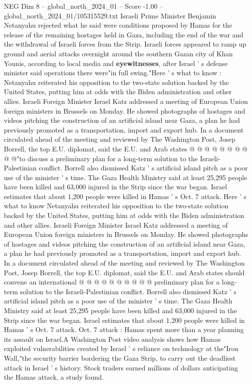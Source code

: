 \begin{textsample}{NEG Dim 8 – global\_north\_2024\_01 – Score -1.00 – global\_north\_2024\_01/105315529.txt}  \label{ex:f8_neg_275}
Israeli Prime Minister Benjamin Netanyahu rejected what he said were conditions proposed by Hamas for the release of the remaining hostages held in Gaza, including the end of the war and the withdrawal of Israeli forces from the Strip.
Israeli forces appeared to ramp up ground and aerial attacks overnight around the southern Gazan city of Khan Younis, according to local media and \textbf{eyewitnesses}, after Israel ' s defense minister said operations there were"in full swing."Here ' s what to know : Netanyahu reiterated his opposition to the two-state solution backed by the United States, putting him at odds with the Biden administration and other allies.
Israeli Foreign Minister Israel Katz addressed a meeting of European Union foreign ministers in Brussels on Monday.
He showed photographs of hostages and videos pitching the construction of an artificial island near Gaza, a plan he had previously promoted as a transportation, import and export hub.
In a document circulated ahead of the meeting and reviewed by The Washington Post, Josep Borrell, the top E.U. diplomat, said the E.U. and Arab states @ @ @ @ @ @ @ @ @ @"to discuss a preliminary plan for a long-term solution to the Israeli-Palestinian conflict.
Borrell also dismissed Katz ' s artificial island pitch as a poor use of the minister ' s time.
The Gaza Health Ministry said at least 25,295 people have been killed and 63,000 injured in the Strip since the war began.
Israel estimates that about 1,200 people were killed in Hamas ' s Oct. 7 attack.
Here ' s what to know Netanyahu reiterated his opposition to the two-state solution backed by the United States, putting him at odds with the Biden administration and other allies.
Israeli Foreign Minister Israel Katz addressed a meeting of European Union foreign ministers in Brussels on Monday.
He showed photographs of hostages and videos pitching the construction of an artificial island near Gaza, a plan he had previously promoted as a transportation, import and export hub.
In a document circulated ahead of the meeting and reviewed by The Washington Post, Josep Borrell, the top E.U. diplomat, said the E.U. and Arab states should convene an international @ @ @ @ @ @ @ @ @ @ preliminary plan for a long-term solution to the Israeli-Palestinian conflict.
Borrell also dismissed Katz ' s artificial island pitch as a poor use of the minister ' s time.
The Gaza Health Ministry said at least 25,295 people have been killed and 63,000 injured in the Strip since the war began.
Israel estimates that about 1,200 people were killed in Hamas ' s Oct. 7 attack.
Oct. 7 attack : Hamas spent more than a year planning its assault on Israel.A Washington Post video analysis shows how Hamas exploited vulnerabilities created by Israel ' s reliance on technology at the"Iron Wall,"the security barrier bordering the Gaza Strip, to carry out the deadliest attack in Israel ' s history.
Stock traders earned millions of dollars anticipating the Hamas attack, a study found.

\end{textsample}
